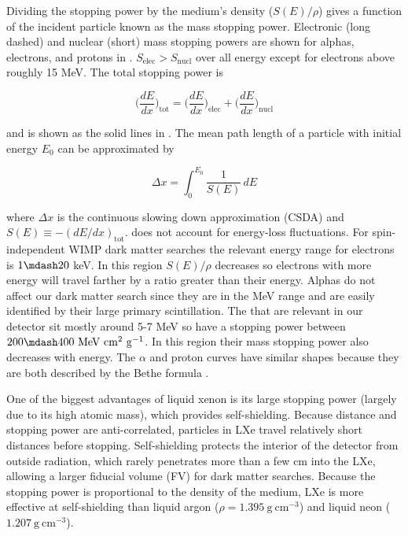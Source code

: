 Dividing the stopping power by the medium's density ($S(E) / \rho$) gives a function of the incident particle known as
the mass stopping power.  Electronic (long dashed) and nuclear (short) mass stopping powers are shown for alphas, electrons, and protons
in .  $S_{\mathrm{elec}} > S_{\mathrm{nucl}}$ over all energy except for electrons above roughly 15
MeV.  The total stopping power is

\begin{equation}
\bigg( \frac{dE}{dx} \bigg)_{\mathrm{tot}} = \bigg( \frac{dE}{dx} \bigg)_{\mathrm{elec}} + \bigg( \frac{dE}{dx} \bigg)_{\mathrm{nucl}}
\end{equation}

\noindent and is shown as the solid lines in .  The mean path length of a particle with initial energy
$E_0$ can be approximated by

\begin{equation}
\Delta x = \int_0^{E_0} \frac{1}{S(E)}\, dE
\label{eq:stopping_power_dist_trav}
\end{equation}

\noindent where $\Delta x$ is the continuous slowing down approximation (CSDA) and
$S(E) \equiv -(dE/dx)_{\mathrm{tot}}$.   does not account for energy-loss
fluctuations.  For spin-independent
WIMP dark matter searches the relevant energy range for electrons is $1 \mdash 20$ keV.  In this region $S(E)/\rho$ decreases so
electrons with more energy will travel farther by a ratio greater than their energy.  Alphas do not affect
our dark matter search since they are in the MeV range and are easily identified by their large primary scintillation.  The
\alphadecays that are relevant in our detector sit mostly around 5-7 MeV so have a stopping power between
$200 \mdash 400\ \mathrm{MeV\ cm^2\ g^{-1}}$.  In this region their mass stopping power also decreases with energy.  The $\alpha$ and
proton curves have similar shapes because they are both described by the Bethe formula .

One of the biggest advantages of liquid xenon is its large stopping power (largely due to its high atomic
mass), which provides self-shielding.  Because distance and stopping power are anti-correlated, particles in LXe travel relatively short
distances before stopping.  Self-shielding protects the interior of the detector from outside radiation,
which rarely penetrates more than a few cm
into the LXe, allowing a larger fiducial volume (FV) for dark matter searches.  Because the stopping power is proportional to the
density of the medium, LXe is more effective at self-shielding than liquid argon ($\rho = 1.395\ \mathrm{g\ cm^{-3}}$) and liquid neon
($1.207\ \mathrm{g\ cm^{-3}}$).

